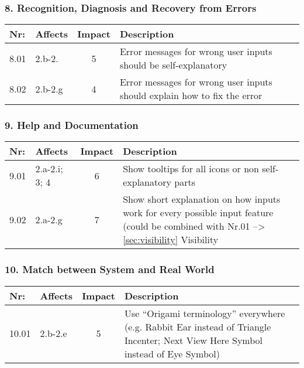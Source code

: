 \subsubsection*{8. Recognition, Diagnosis and Recovery from Errors}
        \begin{tabular}{l | p{} | c | p{}}
        Nr: & Affects & Impact & Description \\ \hline
        8.01 & 2.b-2. & 5 & Error messages for wrong user inputs should be self-explanatory\\ \hline
        8.02 & 2.b-2.g & 4 & Error messages for wrong user inputs should explain how to fix the error\\ \hline
        \end{tabular}

\subsubsection*{9. Help and Documentation}
        \begin{tabular}{l | p{} | c | p{}}
        Nr: & Affects & Impact & Description \\ \hline
        9.01 & 2.a-2.i; 3; 4 & 6 & Show tooltips for all icons or non self-explanatory parts\\ \hline 
        9.02 & 2.a-2.g & 7 & Show short explanation on how inputs work for every possible input feature (could be combined with Nr.01 --> \ref{sec:visibility} Visibility\\ \hline
        \end{tabular}

\subsubsection*{10. Match between System and Real World}
        \begin{tabular}{l | p{} | c | p{}}
        Nr: & Affects & Impact & Description \\ \hline
        10.01 & 2.b-2.e & 5 & Use ``Origami terminology'' everywhere (e.g. Rabbit Ear instead of Triangle Incenter; Next View Here Symbol instead of Eye Symbol)\\ \hline
        \end{tabular}
